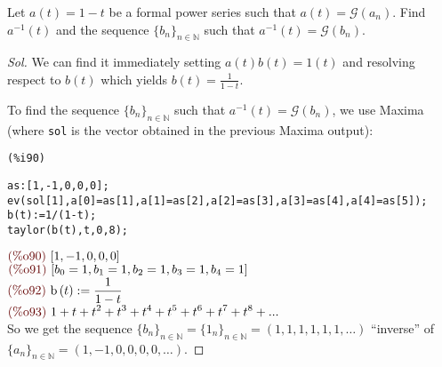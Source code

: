 \begin{exercise}
  Let $a(t) = 1-t$ be a formal power series such that $a(t) =
  \mathcal{G} (a_n)$. Find $a^{-1}(t)$ and the sequence
  $\{b_n\}_{n\in\mathbb{N} } $ such that $a^{-1}(t) = \mathcal{G}(b_n)
  $.
\end{exercise}
\begin{proof}[Sol]
  We can find it immediately setting $a(t)b(t)=1(t)$ and resolving
  respect to $b(t)$ which yields $b(t) = \frac{1}{1-t} $.

  To find the sequence $\{b_n\}_{n\in\mathbb{N} } $ such that
  $a^{-1}(t) = \mathcal{G}(b_n) $, we use Maxima (where
  \texttt{\color{blue}sol} is the vector obtained in the previous
  Maxima output):\\
\noindent
\begin{minipage}[t]{8ex}{\color{red}\bf
\begin{verbatim}
(%i90) 
\end{verbatim}}
\end{minipage}
\begin{minipage}[t]{\textwidth}{\color{blue}
\begin{verbatim}
as:[1,-1,0,0,0];
ev(sol[1],a[0]=as[1],a[1]=as[2],a[2]=as[3],a[3]=as[4],a[4]=as[5]);
b(t):=1/(1-t);
taylor(b(t),t,0,8);
\end{verbatim}}
\end{minipage}
\begin{math}\displaystyle
\parbox{8ex}{\color{labelcolor}(\%o90) }
[1,-1,0,0,0]
\end{math}\\
\begin{math}\displaystyle
\parbox{8ex}{\color{labelcolor}(\%o91) }
[{b}_{0}=1,{b}_{1}=1,{b}_{2}=1,{b}_{3}=1,{b}_{4}=1]
\end{math}\\
\begin{math}\displaystyle
\parbox{8ex}{\color{labelcolor}(\%o92) }
\mathrm{b}\left( t\right) :=\frac{1}{1-t}
\end{math}\\
\begin{math}\displaystyle
\parbox{8ex}{\color{labelcolor}(\%o93) }
1+t+{t}^{2}+{t}^{3}+{t}^{4}+{t}^{5}+{t}^{6}+{t}^{7}+{t}^{8}+...
\end{math}\\
So we get the sequence $\{b_n\}_{n\in\mathbb{N} }
=\{1_n\}_{n\in\mathbb{N} } =(1,1,1,1,1,1,\ldots)$ ``inverse'' of
$\{a_n\}_{n\in\mathbb{N} } =(1,-1,0,0,0,0,\ldots)$.
\end{proof}

